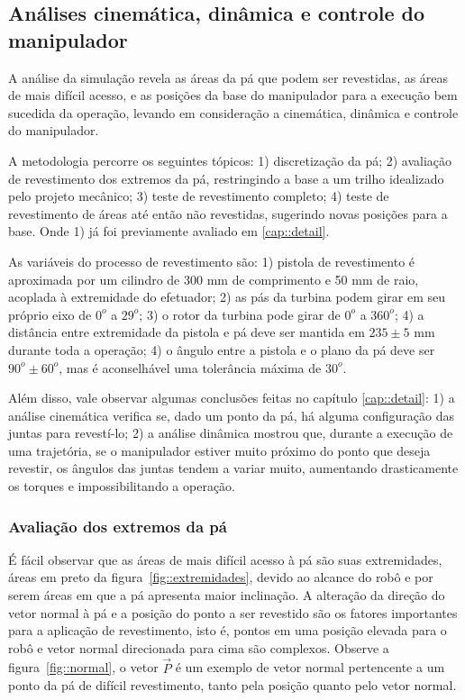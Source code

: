 \subsection{Análises cinemática, dinâmica e
controle do manipulador}

A análise da simulação revela as áreas da pá que podem ser revestidas,
as áreas de mais difícil acesso, e as posições da base do manipulador para a
execução bem sucedida da operação, levando em consideração a cinemática,
dinâmica e controle do manipulador. 

A metodologia percorre os seguintes tópicos: 1) discretização da pá; 2)
avaliação de revestimento dos extremos da pá, restringindo a base a um trilho
idealizado pelo projeto mecânico; 3) teste de revestimento completo; 4) teste de
revestimento de áreas até então não revestidas, sugerindo novas posições para a
base. Onde 1) já foi previamente avaliado em \ref{cap::detail}. 

As variáveis do processo de revestimento são: 1) pistola de revestimento
é aproximada por um cilindro de 300 mm de comprimento e 50 mm de raio, 
acoplada à extremidade do efetuador; 2) as pás da turbina podem girar em seu
próprio eixo de $0^o$ a $29^o$; 3) o rotor da turbina pode girar de
$0^o$ a $360^o$; 4) a distância entre extremidade da pistola e pá deve
ser mantida em $235 \pm 5$ mm durante toda a operação; 4) o ângulo entre a
pistola e o plano da pá deve ser $90^o \pm 60^o$, mas é aconselhável uma
tolerância máxima de $30^o$.

Além disso, vale observar algumas conclusões feitas no capítulo
\ref{cap::detail}: 1) a análise cinemática verifica se, dado um ponto da
pá, há alguma configuração das juntas para revestí-lo; 2) a análise dinâmica
mostrou que, durante a execução de uma trajetória, se o manipulador estiver
muito próximo do ponto que deseja revestir, os ângulos das juntas tendem a
variar muito, aumentando drasticamente os torques e impossibilitando a operação.


\subsubsection{Avaliação dos extremos da pá} 

É fácil observar que as áreas de mais difícil acesso à pá são suas extremidades,
áreas em preto da figura~\ref{fig::extremidades}, devido ao alcance do robô e
por serem áreas em que a pá apresenta maior inclinação. A alteração da direção
do vetor normal à pá e a posição do ponto a ser revestido são os fatores 
importantes para a aplicação de revestimento, isto é, pontos em uma posição
elevada para o robô e vetor normal direcionada para cima são complexos. Observe
a figura~\ref{fig::normal}, o vetor $\vec{P}$ é um exemplo de vetor normal
pertencente a um ponto da pá de difícil revestimento, tanto pela posição quanto
pelo vetor normal.

